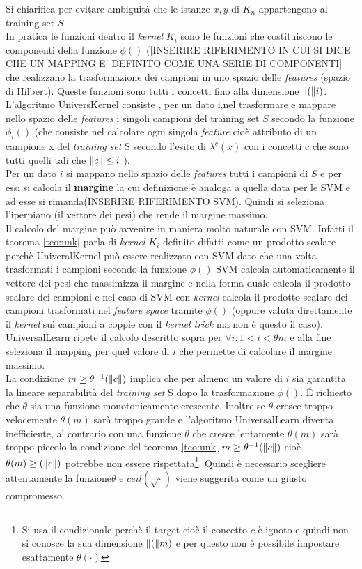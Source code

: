 Si chiarifica per evitare ambiguità che le istanze $x,y$ di $K_n$ appartengono al training set $S$. \\
In pratica le funzioni dentro il \textit{kernel} $K_i$ sono le funzioni che costituiscono le componenti della funzione $\phi()$ ([INSERIRE RIFERIMENTO IN CUI SI DICE CHE UN MAPPING E' DEFINITO COME UNA SERIE DI COMPONENTI] che realizzano la trasformazione dei campioni in uno spazio delle \textit{features} (spazio di Hilbert). Queste funzioni sono tutti i concetti fino alla dimensione $\lVert(\rVert i)$.  L'algoritmo UniversKernel consiste , per un dato i,nel trasformare e mappare nello spazio delle \textit{features} i singoli campioni del training set $S$ secondo la funzione $\phi_{i}()$ (che consiste nel calcolare ogni singola \textit{feature} cioè attributo di un campione x del \textit{training set} S secondo l'esito di $\lambda^{c}(x)$ con i concetti c che sono tutti quelli tali che $\lVert c\rVert \leq i$ ).\\
Per un dato $i$ si mappano nello spazio delle \textit{features} tutti i campioni di $S$ e per essi si calcola il \textbf{margine} la cui definizione è analoga a quella data per le \ac{SVM} e ad esse si rimanda(INSERIRE RIFERIMENTO SVM). Quindi si seleziona l'iperpiano (il vettore dei pesi) che rende il margine massimo.\\
Il calcolo del margine può avvenire in maniera molto naturale con \ac{SVM}. Infatti il teorema \ref{teo:unk} parla di \textit{kernel} $K_i$ definito difatti come un prodotto scalare perchè UniveralKernel può essere realizzato con \ac{SVM} dato che una volta trasformati i campioni secondo la funzione $\phi()$ \ac{SVM} calcola automaticamente il vettore dei pesi che massimizza il margine e nella  forma duale calcola il prodotto scalare dei campioni e nel caso di \ac{SVM} con \textit{kernel} calcola il prodotto scalare dei  campioni trasformati nel \textit{feature space} tramite $\phi()$ (oppure valuta direttamente il \textit{kernel} sui campioni a coppie con il \textit{kernel trick} ma non è questo il caso).\\
UniversalLearn ripete il calcolo descritto sopra per  $\forall i : 1<i<\theta{m}$ e alla fine seleziona il mapping per quel valore di $i$ che permette di calcolare il margine massimo.\\
La condizione $m \geq \theta^{-1}(\lVert c\rVert)$ implica che per almeno un valore di $i$ sia garantita la lineare separabilità del \textit{training set} S dopo la trasformazione $\phi()$. \'E richiesto che $\theta$ sia una funzione monotonicamente crescente. Inoltre se $\theta$ cresce troppo velocemente $\theta(m)$ sarà troppo grande e l'algoritmo UniversalLearn diventa inefficiente, al contrario con una funzione $\theta$ che cresce lentamente $\theta(m)$ sarà troppo piccolo la condizione del teorema \ref{teo:unk}  $m \geq  \theta^{-1}(\lVert c\rVert)$ cioè $\theta(m) \geq  (\lVert c\rVert)$ potrebbe non essere rispettata\footnote{Si usa il condizionale perchè il target cioè il concetto $c$ è ignoto e quindi non si conosce la sua dimensione $\lVert(\rVert m)$ e per questo non è possibile impostare esattamente $\theta(\cdot)$}. Quindi è necessario scegliere attentamente la funzione$\theta$ e $ceil(\sqrt{\cdot})$ viene suggerita come un giusto compromesso.

